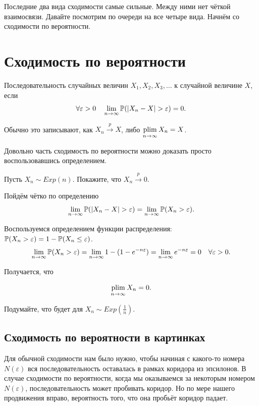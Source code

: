 \documentclass[12pt, a4paper, oneside]{article}
\begin{document}
Последние два вида сходимости самые сильные. Между ними нет чёткой взаимосвязи. Давайте посмотрим по очереди на все четыре вида. Начнём со сходимости по вероятности. 


\section{Сходимость по вероятности}

\begin{definition} 
Последовательность случайных величин $X_1, X_2, X_3, \ldots$  к случайной величине $X$, если 
\[
\forall \varepsilon > 0 \quad \lim_{n \to \infty} \mathbb{P}(|X_n - X| > \varepsilon) = 0.
\]

Обычно это записывают, как $X_n \overset{p}{\to} X$, либо $\operatorname*{plim}\limits_{n \to \infty} X_n = X$.
\end{definition} 

Довольно часть сходимость по вероятности можно доказать просто воспользовавшись определением.  

\begin{problem}{ } 
Пусть $X_n \sim Exp(n)$. Покажите, что $X_n \overset{p}{\to} 0$.
\end{problem} 

\begin{sol}
Пойдём чётко по определению
\[
\lim_{n \to \infty} \mathbb{P}(|X_n - X| > \varepsilon) = \lim_{n \to \infty} \mathbb{P}(X_n > \varepsilon).
\]

Воспользуемся определением функции распределения: $\mathbb{P}(X_n > \varepsilon) = 1 - \mathbb{P}(X_n \le \varepsilon)$.
\[
\lim_{n \to \infty} \mathbb{P}(X_n > \varepsilon) = \lim_{n \to \infty} 1 - (1 - e^{-n \varepsilon}) = \lim_{n \to \infty}  e^{-n \varepsilon} = 0 \quad \forall \varepsilon > 0.
\]

Получается, что 

\[
\operatorname*{plim}_{n \to \infty} X_n = 0.
\]

Подумайте, что будет для $X_n \sim Exp\left( \frac{1}{n} \right)$.
\end{sol}

\subsection{Сходимость по вероятности в картинках}

Для обычной сходимости нам было нужно, чтобы начиная с какого-то номера $N(\varepsilon)$ вся последовательность оставалась в рамках коридора из эпсилонов. В случае сходимости по вероятности, когда мы оказываемся за некоторым номером $N(\varepsilon)$, последовательность может пробивать коридор. Но по мере нашего продвижения вправо, вероятность того, что она пробьёт коридор падает. 
\end{document}
